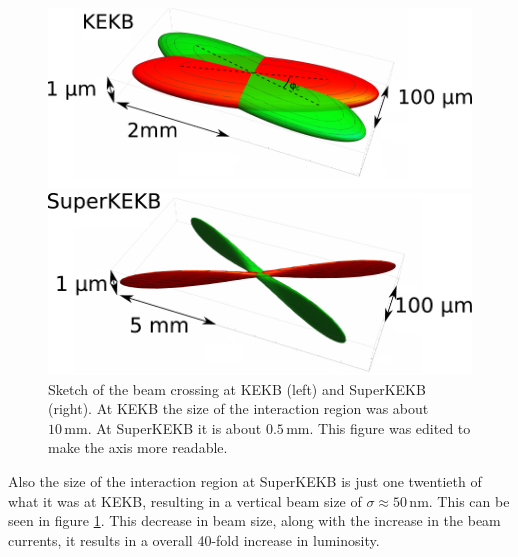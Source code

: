 \documentclass[a4paper,11pt,twosided,final,german,openbib,pdftex,listof=totoc,bibliography=totoc]{scrbook}
\begin{document}
\begin{figure}[h!]
	\centering
	\begin{minipage}[b]{0.45\linewidth}
		\centering
		\includegraphics[width=\textwidth]{Bilder/BeamBelle}
	\end{minipage}
	\hspace{0.5cm}
	\begin{minipage}[b]{0.45\linewidth}
		\centering
		\includegraphics[width=\textwidth]{Bilder/SuperKEKBBeam}
	\end{minipage}
		\caption[Sketch Of The Beam Crossing For KEKB And SuperKEKB]{Sketch of the beam crossing at KEKB (left) and SuperKEKB (right). At KEKB the size of the interaction region was about $10\,\textrm{mm}$. At SuperKEKB it is about $0.5\,\textrm{mm}$.\cite{Beamsize} This figure was edited to make the axis more readable.}
	\label{fig:beamsize}

\end{figure}







Also the size of the interaction region at SuperKEKB is just one twentieth of what it was at KEKB, resulting in a vertical beam size of $\sigma \approx 50\,\textrm{nm} $. This can be seen in figure \ref{fig:beamsize}. This decrease in beam size, along with the increase in the beam currents, it results in a overall 40-fold increase in luminosity.  \cite{B2TR} \cite{B2B}
\end{document}
